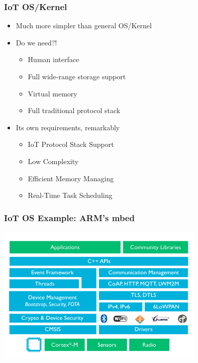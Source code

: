 \documentclass{beamer}
\begin{document}
\begin{frame}
	\frametitle{IoT OS/Kernel}
	\begin{itemize}
		\item Much more simpler than general OS/Kernel
		\item Do we need?!
		\begin{itemize}
			\item Human interface
			\item Full wide-range storage support
			\item Virtual memory
			\item Full traditional protocol stack 
		\end{itemize}
		\item Its own requirements, remarkably
		\begin{itemize}
			\justifying
			\item IoT Protocol Stack Support
			\item Low Complexity
			\item Efficient Memory Managing
			\item Real-Time Task Scheduling
		\end{itemize}			
	\end{itemize}
\end{frame}

\begin{frame}
	\frametitle{IoT OS Example: ARM's mbed}
	\begin{center}
	\includegraphics[width=10cm]{figs/mbed-components.png}	
	\end{center}
\end{frame}
\end{document}
